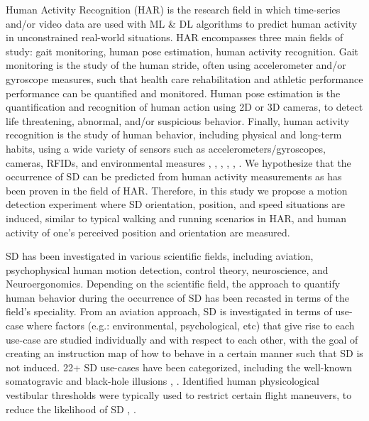 \documentclass{ieeeaccess}
\begin{document}
Human Activity Recognition (HAR) is the research field in which time-series and/or video data are used with ML \& DL algorithms to predict human activity in unconstrained real-world situations. HAR encompasses three main fields of study: gait monitoring, human pose estimation, human activity recognition. Gait monitoring is the study of the human stride, often using accelerometer and/or gyroscope measures, such that health care rehabilitation and athletic performance performance can be quantified and monitored. Human pose estimation is the quantification and recognition of human action using 2D or 3D cameras, to detect life threatening, abnormal, and/or suspicious behavior. Finally, human activity recognition is the study of human behavior, including physical and long-term habits, using a wide variety of sensors such as accelerometers/gyroscopes, cameras, RFIDs, and environmental measures \cite{Anguita_2012_SVMHumanActivity}, \cite{Dirgova_2022_Wearable}, \cite{Fu_2020_Sensing}, \cite{Von_2017_Sparse}, \cite{Nedorubova_2021_CWT_CNN_HumanActivity}, \cite{An_2021_Mgait} \cite{Xiao_2003_DeepLearning}. We hypothesize that the occurrence of SD can be predicted from human activity measurements as has been proven in the field of HAR. Therefore, in this study we propose a motion detection experiment where SD orientation, position, and speed situations are induced, similar to typical walking and running scenarios in HAR, and human activity of one's perceived position and orientation are measured.

SD has been investigated in various scientific fields, including aviation, psychophysical human motion detection, control theory, neuroscience, and Neuroergonomics. Depending on the scientific field, the approach to quantify human behavior during the occurrence of SD has been recasted in terms of the field's speciality. From an aviation approach, SD is investigated in terms of use-case where factors (e.g.: environmental, psychological, etc) that give rise to each use-case are studied individually and with respect to each other, with the goal of creating an instruction map of how to behave in a certain manner such that SD is not induced. 22+ SD use-cases have been categorized, including the well-known somatogravic and black-hole illusions \cite{Newman_2007_SD}, \cite{Gillingham_1993_Spatial}.  Identified human physicological vestibular thresholds were typically used to restrict certain flight maneuvers, to reduce the likelihood of SD \cite{Gillingham_1993_Spatial}, \cite{Previc_2004_Spatial}. 
\end{document}
